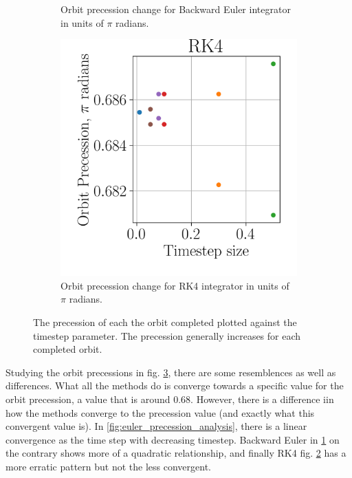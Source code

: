 \begin{figure}[!ht]
\begin{subfigure}[h!]{0.3\textwidth}
		\caption{Orbit precession change for Backward Euler integrator in units of $\pi$ radians.}
		\label{fig:back_euler_precession_analysis}
	\end{subfigure}
	\hfill
	\begin{subfigure}[h!]{0.3\textwidth}
		\centering
		\includegraphics[width=\textwidth]{figures/precession_analysis/rk4.png}
		\caption{Orbit precession change for RK4 integrator in units of $\pi$ radians. } 
		\label{fig:rk4_precession_analysis}
	\end{subfigure}
	\caption{The precession of each the orbit completed plotted against the timestep parameter. The precession generally increases for each completed orbit. }
	\label{fig:precession_analysis}
\end{figure}

Studying the orbit precessions in fig. \ref{fig:precession_analysis}, there are some resemblences as well as differences. What all the methods do is converge towards a specific value for the orbit precession, a value that is around $0.68$. However, there is a difference iin how the methods converge to the precession value (and exactly what this convergent value is). In \ref{fig:euler_precession_analysis}, there is a linear convergence as the time step with decreasing timestep. Backward Euler in \ref{fig:back_euler_precession_analysis} on the contrary shows more of a quadratic relationship, and finally RK4 fig. \ref{fig:rk4_precession_analysis} has a more erratic pattern but not the less convergent. 

